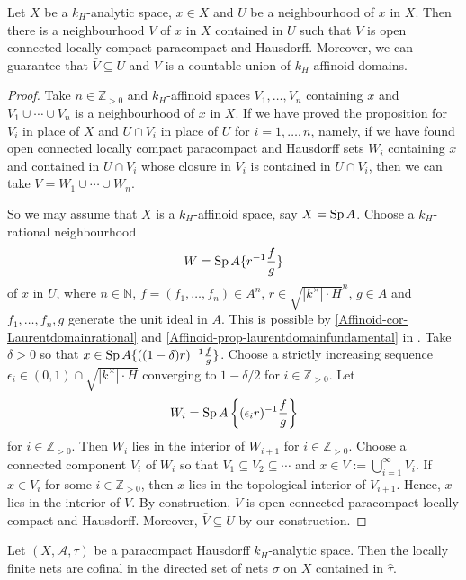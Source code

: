 \begin{proposition}\label{prop-kanalyticspacelocal}
    Let $X$ be a $k_H$-analytic space, $x\in X$ and $U$ be a neighbourhood of $x$ in $X$. Then there is a neighbourhood $V$ of $x$ in $X$ contained in $U$ such that $V$ is open connected locally compact paracompact and Hausdorff. Moreover, we can guarantee that $\bar{V}\subseteq U$ and $V$ is a countable union of $k_H$-affinoid domains.
\end{proposition}
\begin{proof}
    Take $n\in \mathbb{Z}_{>0}$ and $k_H$-affinoid spaces $V_1,\ldots,V_n$ containing $x$ and $V_1\cup\cdots\cup V_n$ is a neighbourhood of $x$ in $X$. If we have proved the proposition for $V_i$ in place of $X$ and $U\cap V_i$ in place of $U$ for $i=1,\ldots,n$, namely, if we have found open connected locally compact paracompact and Hausdorff sets $W_i$ containing $x$ and contained in $U\cap V_i$ whose closure in $V_i$ is contained in $U\cap V_i$,
    then we can take $V=W_1\cup\cdots\cup W_n$.

    So we may assume that $X$ is a $k_H$-affinoid space, say $X=\operatorname{Sp} A$. Choose a $k_H$-rational neighbourhood 
    \[
        W=\operatorname{Sp} A\{r^{-1}\frac{f}{g}\}  
    \]
    of $x$ in $U$, where $n\in \mathbb{N}$,  $f=(f_1,\ldots,f_n)\in A^n$, $r\in \sqrt{|k^{\times}|\cdot H}^n$, $g\in A$ and $f_1,\ldots,f_n,g$ generate the unit ideal in $A$. This is possible by \cref{Affinoid-cor-Laurentdomainrational} and \cref{Affinoid-prop-laurentdomainfundamental} in . 
    Take $\delta>0$ so that $x\in \operatorname{Sp} A\{((1-\delta)r)^{-1}\frac{f}{g}\}$.
    Choose a strictly increasing sequence $\epsilon_i\in (0,1)\cap \sqrt{|k^{\times}|\cdot H}$ converging to $1-\delta/2$ for $i\in \mathbb{Z}_{>0}$. Let 
    \[
        W_i=\operatorname{Sp} A\left\{ (\epsilon_i r)^{-1}\frac{f}{g} \right\}  
    \]
    for $i\in \mathbb{Z}_{>0}$.
    Then $W_i$ lies in the interior of $W_{i+1}$ for $i\in \mathbb{Z}_{>0}$. Choose a connected component $V_i$ of $W_i$ so that $V_1\subseteq V_2\subseteq \cdots$ and $x\in V:=\bigcup_{i=1}^{\infty} V_i$. If $x\in V_i$ for some $i\in \mathbb{Z}_{>0}$, then $x$ lies in the topological interior of $V_{i+1}$. Hence, $x$ lies in the interior of $V$. By construction, $V$ is open connected paracompact locally compact and Hausdorff. Moreover, $\bar{V}\subseteq U$ by our construction.
\end{proof}

\begin{proposition}
    Let $(X,\mathcal{A},\tau)$ be a paracompact Hausdorff $k_H$-analytic space. Then the locally finite nets are cofinal in the directed set of nets $\sigma$ on $X$ contained in $\hat{\tau}$. 
\end{proposition}

